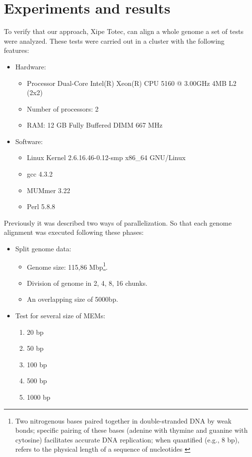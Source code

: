 \documentclass[twocolumn,twoside]{Jornadas}
\begin{document}
\section{Experiments and results}
To verify that our approach, Xipe Totec, can align a whole genome a set of tests were analyzed. These tests were carried out in a cluster with the following features:
\begin{itemize}
\item Hardware: 
\begin{itemize}
\item Processor Dual-Core Intel(R) Xeon(R) CPU 5160 @ 3.00GHz 4MB L2 (2x2)
\item Number of processors: 2
\item RAM: 12 GB Fully Buffered DIMM 667 MHz
\end{itemize}
\item  Software:
\begin{itemize}
\item Linux Kernel 2.6.16.46-0.12-smp x86\_64 GNU/Linux
\item gcc 4.3.2
\item MUMmer 3.22
\item Perl 5.8.8
\end{itemize}
\end{itemize}
Previously it was described two ways of parallelization. So that each genome alignment was executed following these phases:
\begin{itemize}
\item Split genome data:
\begin{itemize}
\item Genome size: 115,86 Mbp\footnote{Two nitrogenous bases paired together in double-stranded DNA by weak bonds; specific pairing of these bases (adenine with thymine and guanine with cytosine) facilitates accurate DNA replication; when quantified (e.g., 8 bp), refers to the physical length of a sequence of nucleotides \cite{ncbi}}.
\item Division of genome in 2, 4, 8, 16 chunks.
\item An overlapping size of 5000bp.
\end{itemize}
\item Test for several size of MEMs:
  \begin{enumerate}
    \item 20 bp
    \item 50 bp
    \item 100 bp
    \item 500 bp
    \item 1000 bp
  \end{enumerate} 
\end{itemize}
\end{document}
